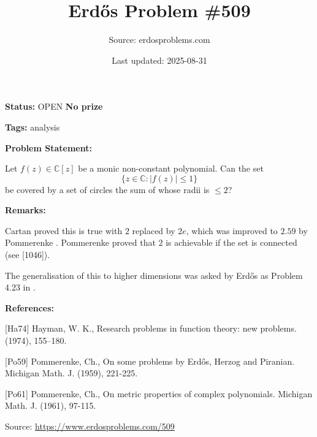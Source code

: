 \documentclass{article}
\title{Erd\H{o}s Problem \#509}
\date{Last updated: 2025-08-31}
\author{Source: erdosproblems.com}
\begin{document}
\maketitle

\noindent\textbf{Status:} OPEN \quad \textbf{No prize}

\noindent\textbf{Tags:} analysis

\medskip
\noindent\textbf{Problem Statement:}

Let $f(z)\in\mathbb{C}[z]$ be a monic non-constant polynomial. Can the set\[\{ z\in \mathbb{C} : \lvert f(z)\rvert \leq 1\}\]be covered by a set of circles the sum of whose radii is $\leq 2$?

\bigskip
\noindent\textbf{Remarks:}

Cartan proved this is true with $2$ replaced by $2e$, which was improved to $2.59$ by Pommerenke \cite{Po61}. Pommerenke \cite{Po59} proved that $2$ is achievable if the set is connected (see [1046]).

The generalisation of this to higher dimensions was asked by Erd\H{o}s as Problem 4.23 in \cite{Ha74}.

\bigskip
\noindent\textbf{References:}

[Ha74] Hayman, W. K., Research problems in function theory: new problems. (1974), 155--180.
 
 [Po59] Pommerenke, Ch., On some problems by Erd\H{o}s, Herzog and Piranian. Michigan Math. J. (1959), 221-225.
 
 [Po61] Pommerenke, Ch., On metric properties of complex polynomials. Michigan Math. J. (1961), 97-115.

\bigskip
\noindent\small{Source: \url{https://www.erdosproblems.com/509}}
\end{document}
